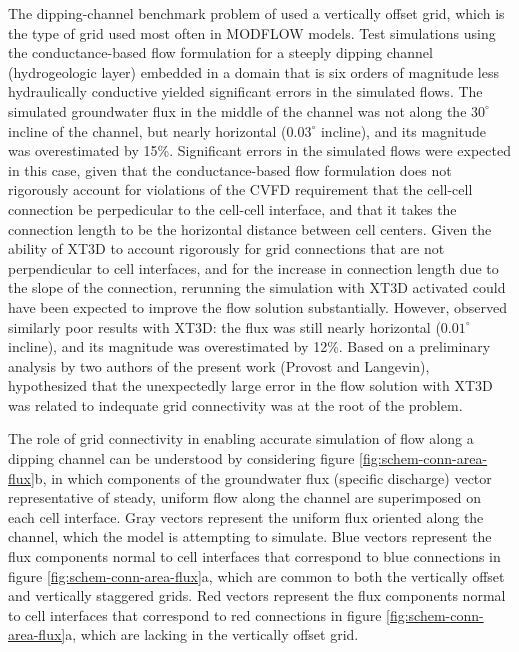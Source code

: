 \documentclass{article}
\begin{document}
The dipping-channel benchmark problem of \cite{bardot2022} used a vertically offset grid, which is the type of grid used most often in MODFLOW models. Test simulations using the conductance-based flow formulation for a steeply dipping channel (hydrogeologic layer) embedded in a domain that is six orders of magnitude less hydraulically conductive yielded significant errors in the simulated flows. The simulated groundwater flux in the middle of the channel was not along the $30^{\circ}$ incline of the channel, but nearly horizontal ($0.03^{\circ}$ incline), and its magnitude was overestimated by 15\%. Significant errors in the simulated flows were expected in this case, given that the conductance-based flow formulation does not rigorously account for violations of the CVFD requirement that the cell-cell connection be perpedicular to the cell-cell interface, and that it takes the connection length to be the horizontal distance between cell centers.  Given the ability of XT3D to account rigorously for grid connections that are not perpendicular to cell interfaces, and for the increase in connection length due to the slope of the connection, rerunning the simulation with XT3D activated could have been expected to improve the flow solution substantially. However, \cite{bardot2022} observed similarly poor results with XT3D: the flux was still nearly horizontal ($0.01^{\circ}$ incline), and its magnitude was overestimated by 12\%. Based on a preliminary analysis by two authors of the present work (Provost and Langevin), \cite{bardot2022} hypothesized that the unexpectedly large error in the flow solution with XT3D was related to indequate grid connectivity was at the root of the problem.

The role of grid connectivity in enabling accurate simulation of flow along a dipping channel can be understood by considering figure \ref{fig:schem-conn-area-flux}b, in which components of the groundwater flux (specific discharge) vector representative of steady, uniform flow along the channel are superimposed on each cell interface. Gray vectors represent the uniform flux oriented along the channel, which the model is attempting to simulate. Blue vectors represent the flux components normal to cell interfaces that correspond to blue connections in figure \ref{fig:schem-conn-area-flux}a, which are common to both the vertically offset and vertically staggered grids. Red vectors represent the flux components normal to cell interfaces that correspond to red connections in figure \ref{fig:schem-conn-area-flux}a, which are lacking in the vertically offset grid.
\end{document}
